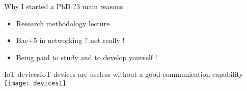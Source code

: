 
\begin{frame}{Why I started a PhD ?}{3 main reasons}
	\begin{itemize}
		\item Research methodology lecture.
		\item Bac+5 in networking ? not really !
		\item Being paid to study and to develop yourself !
	\end{itemize}
\end{frame}

\begin{frame}{IoT devices}{IoT devices are useless without a good communication capability}
	\centering
	\texttt{[image: devices1]}
\end{frame}

